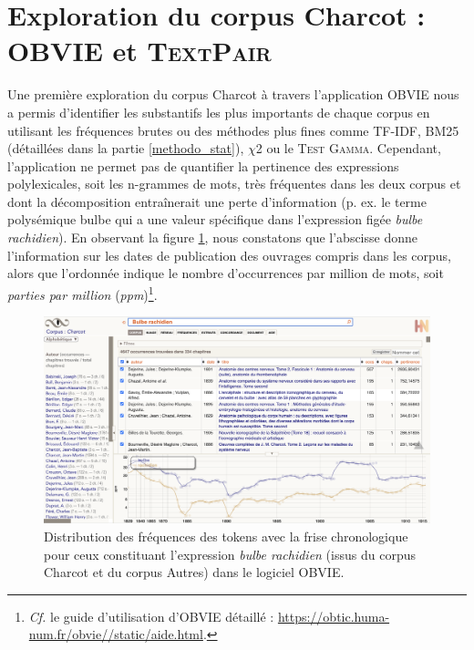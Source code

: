\label{resultats}

\section{Exploration du corpus Charcot : \textsc{OBVIE} et \textsc{TextPair}}
Une première exploration du corpus Charcot à travers l'application OBVIE nous a permis d'identifier les substantifs les plus importants de chaque corpus en utilisant les fréquences brutes ou des méthodes plus fines comme \textsc{TF-IDF}, \textsc{BM25} (détaillées dans la partie \ref{methodo_stat}), \textsc{$\chi$2} ou le \textsc{Test Gamma}. Cependant, l'application ne permet pas de quantifier la pertinence des expressions polylexicales, soit les n-grammes de mots, très fréquentes dans les deux corpus et dont la décomposition entraînerait une perte d'information (p. ex. le terme polysémique \og{}bulbe\fg{} qui a une valeur spécifique dans l'expression figée \textit{bulbe rachidien}). En observant la figure \ref{fig:bulbe}, nous constatons que l'abscisse donne l'information sur les dates de publication des ouvrages compris dans les corpus, alors que l'ordonnée indique le nombre d'occurrences par million de mots, soit \textit{parties par million} (\textit{ppm})\footnote{\textit{Cf.} le guide d'utilisation d'\textsc{OBVIE} détaillé : \url{https://obtic.huma-num.fr/obvie//static/aide.html}.}. 
\begin{figure}[!ht]
    \centering
    \includegraphics[width=1\textwidth]{img/bulbe_rachidien_mini.png}
    \caption{Distribution des fréquences des tokens avec la frise chronologique pour ceux constituant l'expression \textit{bulbe rachidien} (issus du corpus \og{}Charcot\fg{} et du corpus \og{}Autres\fg{}) dans le logiciel OBVIE.
    }
    \label{fig:bulbe}
\end{figure}

